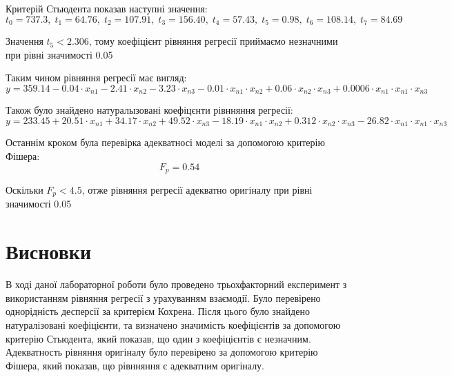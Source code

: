 Критерій Стьюдента показав наступні значення:
\[t_0=737.3,\; t_1=64.76,\; t_2=107.91,\; t_3=156.40,\; t_4=57.43,\; t_5=0.98,\; t_6=108.14,\; t_7=84.69\]

Значення $t_5<2.306$, тому коефіцієнт рівняння регресії приймаємо
незначними при рівні значимості 0.05

Таким чином рівняння регресії має вигляд:
\[y = 359.14-0.04\cdot x_{n1}-2.41\cdot x_{n2}-3.23\cdot x_{n3}-0.01\cdot x_{n1}\cdot x_{n2}+0.06\cdot x_{n2}\cdot x_{n3}+0.0006\cdot x_{n1}\cdot x_{n1}\cdot x_{n3}\]

Також було знайдено натуралызовані коефіцєнти рівнняння регресії:
\[y = 233.45+20.51\cdot x_{n1}+34.17\cdot x_{n2}+49.52\cdot x_{n3}-18.19\cdot x_{n1}\cdot x_{n2}+0.312\cdot x_{n2}\cdot x_{n3}-26.82\cdot x_{n1}\cdot x_{n1}\cdot x_{n3}\]

Останнім кроком була перевірка адекватносі моделі за допомогою критерію Фішера:
\[F_p = 0.54\]

Оскільки $F_p<4.5$, отже рівняння регресії адекватно оригіналу при рівні 
значимості 0.05

\section{Висновки}
В ході даної лабораторної роботи було проведено трьохфакторний експеримент з 
використанням рівняння регресії з урахуванням взаємодії. Було перевірено однорідність десперсії
за критерієм Кохрена. Після цього було знайдено натуралізовані коефіцієнти, та визначено
значимість коефіцієнтів за допомогою критерію Стьюдента, який показав, що один з 
коефіцієнтів є незначним. Адекватность рівняння оригіналу було перевірено за допомогою
критерію Фішера, який показав, що рівнняння є адекватним оригіналу.